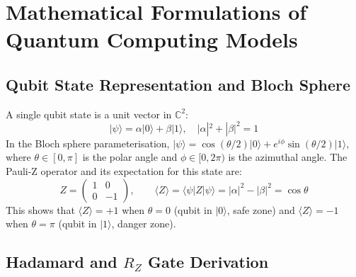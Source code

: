 \section{Mathematical Formulations of Quantum Computing Models}

\subsection{Qubit State Representation and Bloch Sphere}

A single qubit state is a unit vector in $\mathbb{C}^2$:
\begin{equation}
    |\psi\rangle = \alpha|0\rangle + \beta|1\rangle, \quad |\alpha|^2 + |\beta|^2 = 1
    \label{eq:qubit}
\end{equation}
In the Bloch sphere parameterisation, $|\psi\rangle = \cos(\theta/2)|0\rangle + e^{i\phi}\sin(\theta/2)|1\rangle$, where $\theta \in [0,\pi]$ is the polar angle and $\phi \in [0, 2\pi)$ is the azimuthal angle. The Pauli-Z operator and its expectation for this state are:
\begin{equation}
    Z = \begin{pmatrix} 1 & 0 \\ 0 & -1 \end{pmatrix}, \qquad
    \langle Z \rangle = \langle\psi|Z|\psi\rangle = |\alpha|^2 - |\beta|^2 = \cos\theta
    \label{eq:pauli_z_exp}
\end{equation}
This shows that $\langle Z \rangle = +1$ when $\theta = 0$ (qubit in $|0\rangle$, safe zone) and $\langle Z \rangle = -1$ when $\theta = \pi$ (qubit in $|1\rangle$, danger zone).

\subsection{Hadamard and $R_Z$ Gate Derivation}

